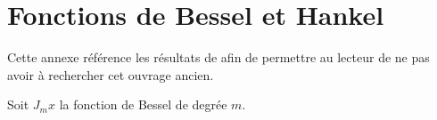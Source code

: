 \section{Fonctions de Bessel et Hankel}

Cette annexe référence les résultats de \cite{abramowitz_handbook_1964} afin de permettre au lecteur de ne pas avoir à rechercher cet ouvrage ancien.

Soit $J_m{x}$ la fonction de Bessel de degrée $m$.